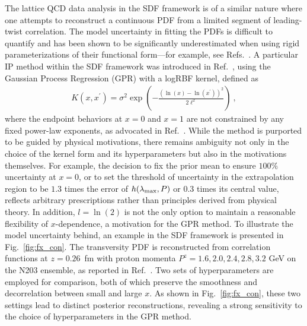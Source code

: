 \documentclass[prd,twocolumn,superscriptaddress,preprintnumbers,showpacs,nofootinbib,notitlepage,floatfix]{revtex4-2}
\DeclareRobustCommand{\fig}[1]{Fig.~\ref{fig:#1}}
\begin{document}
The lattice QCD data analysis in the SDF framework is of a similar nature where one attempts to reconstruct a continuous PDF from a limited segment of leading-twist correlation. The model uncertainty in fitting the PDFs is difficult to quantify and has been shown to be significantly underestimated when using rigid parameterizations of their functional form---for example, see Refs.~\cite{Khan:2022vot,Chowdhury:2024ymm}. A particular IP method within the SDF framework was introduced in Ref.~\cite{Dutrieux:2024rem}, using the Gaussian Process Regression (GPR) with a logRBF kernel, defined as
\begin{align}
    K\left(x, x^{\prime}\right)=\sigma^2 \exp \left(-\frac{\left(\ln (x)-\ln \left(x^{\prime}\right)\right)^2}{2 \ell^2}\right) ~,
\end{align}
where the endpoint behaviors at $x = 0$ and $x = 1$ are not constrained by any fixed power-law exponents, as advocated in Ref.~\cite{Dutrieux:2024rem}. While the method is purported to be guided by physical motivations, there remains ambiguity not only in the choice of the kernel form and its hyperparameters but also in the motivations themselves. For example, the decision to fix the prior mean to ensure $100\%$ uncertainty at $x=0$, or to set the threshold of uncertainty in the extrapolation region to be $1.3$ times the error of $h(\lambda_{\rm max},P)$ or $0.3$ times its central value, reflects arbitrary prescriptions rather than principles derived from physical theory. In addition, $l=\ln(2)$ is not the only option to maintain a reasonable flexibility of $x$-dependence, a motivation for the GPR method. To illustrate the model uncertainty behind, an example in the SDF framework is presented in \fig{fx_con}. The transversity PDF is reconstructed from correlation functions at $z=0.26$~fm with proton momenta $P^z = 1.6, 2.0, 2.4, 2.8, 3.2$ GeV on the N203 ensemble, as reported in Ref.~\cite{LatticeParton:2022xsd}. Two sets of hyperparameters are employed for comparison, both of which preserve the smoothness and decorrelation between small and large $x$. As shown in \fig{fx_con}, these two settings lead to distinct posterior reconstructions, revealing a strong sensitivity to the choice of hyperparameters in the GPR method.
\end{document}
